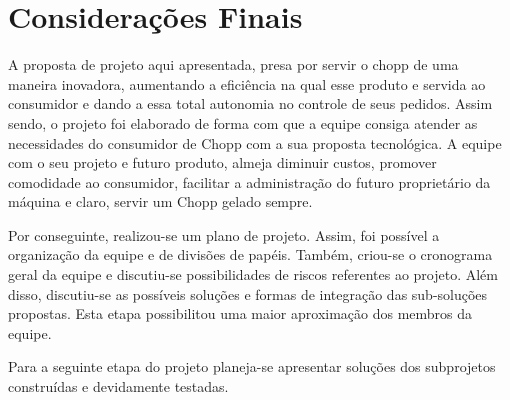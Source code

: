 \chapter[Considerações Finais]{Considerações Finais}
	A proposta de projeto aqui apresentada, presa por servir o chopp de uma maneira inovadora, aumentando a eficiência na qual esse produto e servida ao consumidor e dando a essa total autonomia no controle de seus pedidos. Assim sendo, o projeto foi elaborado de forma com que a equipe consiga atender as necessidades do consumidor de Chopp com a sua proposta tecnológica. A equipe com o seu projeto e futuro produto,  almeja diminuir custos, promover comodidade ao consumidor, facilitar a administração do futuro proprietário da máquina e claro, servir um Chopp gelado sempre.

	Por conseguinte, realizou-se um plano de projeto. Assim, foi possível a organização da equipe e de divisões de papéis. Também, criou-se o cronograma geral da equipe e discutiu-se possibilidades de riscos referentes ao projeto. Além disso, discutiu-se as possíveis soluções e formas de integração das sub-soluções propostas. Esta etapa possibilitou uma maior aproximação dos membros da equipe.
	
	Para a seguinte etapa do projeto planeja-se apresentar soluções dos subprojetos construídas e devidamente testadas.   

